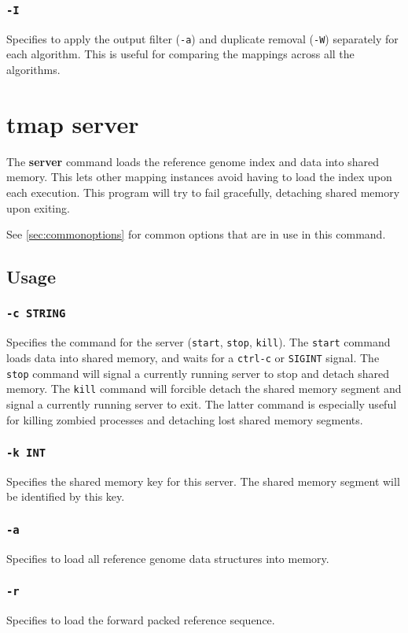 \documentclass[a4paper,12pt]{book}
\newcommand{\TT}[1]{{\tt #1}} %
\newcommand{\BF}[1]{{\bf #1}} %
\begin{document}
\subsubsection{\TT{-I}}
Specifies to apply the output filter (\TT{-a}) and duplicate removal (\TT{-W}) separately for each algorithm.
This is useful for comparing the mappings across all the algorithms.

\section{tmap server}
\label{sec:server}
The \BF{server} command loads the reference genome index and data into shared memory.
This lets other mapping instances avoid having to load the index upon each execution.
This program will try to fail gracefully, detaching shared memory upon exiting.

See \autoref{sec:commonoptions} for common options that are in use in this command.
\subsection{Usage}

\subsubsection{\TT{-c STRING}}
Specifies the command for the server (\TT{start}, \TT{stop}, \TT{kill}).
The \TT{start} command loads data into shared memory, and waits for a \TT{ctrl-c} or \TT{SIGINT} signal.
The \TT{stop} command will signal a currently running server to stop and detach shared memory.
The \TT{kill} command will forcible detach the shared memory segment and signal a currently running server to exit.
The latter command is especially useful for killing zombied processes and detaching lost shared memory segments.

\subsubsection{\TT{-k INT}}
Specifies the shared memory key for this server.
The shared memory segment will be identified by this key.

\subsubsection{\TT{-a}}
Specifies to load all reference genome data structures into memory.

\subsubsection{\TT{-r}}
Specifies to load the forward packed reference sequence.
\end{document}
